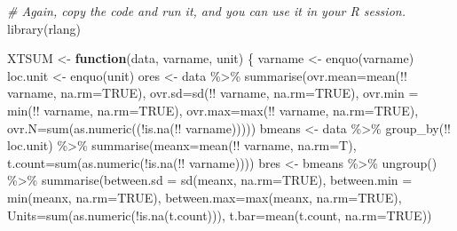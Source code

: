\documentclass[
]{book}
\newenvironment{Shaded}{\begin{snugshade}}{\end{snugshade}}
\newcommand{\AttributeTok}[1]{\textcolor[rgb]{0.77,0.63,0.00}{#1}}
\newcommand{\CommentTok}[1]{\textcolor[rgb]{0.56,0.35,0.01}{\textit{#1}}}
\newcommand{\ConstantTok}[1]{\textcolor[rgb]{0.00,0.00,0.00}{#1}}
\newcommand{\ControlFlowTok}[1]{\textcolor[rgb]{0.13,0.29,0.53}{\textbf{#1}}}
\newcommand{\FunctionTok}[1]{\textcolor[rgb]{0.00,0.00,0.00}{#1}}
\newcommand{\NormalTok}[1]{#1}
\newcommand{\OtherTok}[1]{\textcolor[rgb]{0.56,0.35,0.01}{#1}}
\newcommand{\SpecialCharTok}[1]{\textcolor[rgb]{0.00,0.00,0.00}{#1}}
\begin{document}
\begin{Shaded}
\begin{Highlighting}[]
\CommentTok{\# Again, copy the code and run it, and you can use it in your R session. }
\FunctionTok{library}\NormalTok{(rlang)}

\NormalTok{XTSUM }\OtherTok{\textless{}{-}} \ControlFlowTok{function}\NormalTok{(data, varname, unit) \{}
\NormalTok{  varname }\OtherTok{\textless{}{-}} \FunctionTok{enquo}\NormalTok{(varname)}
\NormalTok{  loc.unit }\OtherTok{\textless{}{-}} \FunctionTok{enquo}\NormalTok{(unit)}
\NormalTok{ores }\OtherTok{\textless{}{-}}\NormalTok{ data }\SpecialCharTok{\%\textgreater{}\%} \FunctionTok{summarise}\NormalTok{(}\AttributeTok{ovr.mean=}\FunctionTok{mean}\NormalTok{(}\SpecialCharTok{!!}\NormalTok{ varname, }\AttributeTok{na.rm=}\ConstantTok{TRUE}\NormalTok{), }\AttributeTok{ovr.sd=}\FunctionTok{sd}\NormalTok{(}\SpecialCharTok{!!}\NormalTok{ varname, }\AttributeTok{na.rm=}\ConstantTok{TRUE}\NormalTok{), }\AttributeTok{ovr.min =} \FunctionTok{min}\NormalTok{(}\SpecialCharTok{!!}\NormalTok{ varname, }\AttributeTok{na.rm=}\ConstantTok{TRUE}\NormalTok{), }\AttributeTok{ovr.max=}\FunctionTok{max}\NormalTok{(}\SpecialCharTok{!!}\NormalTok{ varname, }\AttributeTok{na.rm=}\ConstantTok{TRUE}\NormalTok{), }\AttributeTok{ovr.N=}\FunctionTok{sum}\NormalTok{(}\FunctionTok{as.numeric}\NormalTok{((}\SpecialCharTok{!}\FunctionTok{is.na}\NormalTok{(}\SpecialCharTok{!!}\NormalTok{ varname)))))}
\NormalTok{bmeans }\OtherTok{\textless{}{-}}\NormalTok{ data }\SpecialCharTok{\%\textgreater{}\%} \FunctionTok{group\_by}\NormalTok{(}\SpecialCharTok{!!}\NormalTok{ loc.unit) }\SpecialCharTok{\%\textgreater{}\%} \FunctionTok{summarise}\NormalTok{(}\AttributeTok{meanx=}\FunctionTok{mean}\NormalTok{(}\SpecialCharTok{!!}\NormalTok{ varname, }\AttributeTok{na.rm=}\NormalTok{T), }\AttributeTok{t.count=}\FunctionTok{sum}\NormalTok{(}\FunctionTok{as.numeric}\NormalTok{(}\SpecialCharTok{!}\FunctionTok{is.na}\NormalTok{(}\SpecialCharTok{!!}\NormalTok{ varname))))}
\NormalTok{bres }\OtherTok{\textless{}{-}}\NormalTok{ bmeans }\SpecialCharTok{\%\textgreater{}\%} \FunctionTok{ungroup}\NormalTok{() }\SpecialCharTok{\%\textgreater{}\%} \FunctionTok{summarise}\NormalTok{(}\AttributeTok{between.sd =} \FunctionTok{sd}\NormalTok{(meanx, }\AttributeTok{na.rm=}\ConstantTok{TRUE}\NormalTok{), }\AttributeTok{between.min =} \FunctionTok{min}\NormalTok{(meanx, }\AttributeTok{na.rm=}\ConstantTok{TRUE}\NormalTok{), }\AttributeTok{between.max=}\FunctionTok{max}\NormalTok{(meanx, }\AttributeTok{na.rm=}\ConstantTok{TRUE}\NormalTok{), }\AttributeTok{Units=}\FunctionTok{sum}\NormalTok{(}\FunctionTok{as.numeric}\NormalTok{(}\SpecialCharTok{!}\FunctionTok{is.na}\NormalTok{(t.count))), }\AttributeTok{t.bar=}\FunctionTok{mean}\NormalTok{(t.count, }\AttributeTok{na.rm=}\ConstantTok{TRUE}\NormalTok{))}

\end{Highlighting}
\end{Shaded}
\end{document}

